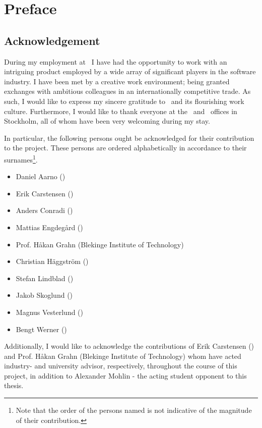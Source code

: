 
\chapter*{Preface}
\label{cha:preface}

\section*{Acknowledgement}
\label{sec:preface_acknowledgement}
During my employment at \dvttermintel\ I have had the opportunity to work with an intriguing product employed by a wide array of significant players in the software industry.
I have been met by a creative work environment; being granted exchanges with ambitious colleagues in an internationally competitive trade.
As such, I would like to express my sincere gratitude to \dvttermintel\ and its flourishing work culture.
Furthermore, I would like to thank everyone at the \dvttermintel\ and \dvttermwindriver\ offices in Stockholm, all of whom have been very welcoming during my stay.

In particular, the following persons ought be acknowledged for their contribution to the project.
These persons are ordered alphabetically in accordance to their surnames\footnote{Note that the order of the persons named is not indicative of the magnitude of their contribution.}.

\begin{itemize}[noitemsep]
	\item Daniel Aarno (\dvttermintel )
	\item Erik Carstensen (\dvttermintel )
	\item Anders Conradi (\dvttermintel )
	\item Mattias Engdegård (\dvttermintel )
	\item Prof. Håkan Grahn (Blekinge Institute of Technology)
	\item Christian Häggström (\dvttermintel )
	\item Stefan Lindblad (\dvttermintel )
	\item Jakob Skoglund (\dvttermwindriver )
	\item Magnus Vesterlund (\dvttermwindriver )
	\item Bengt Werner (\dvttermintel )
\end{itemize}

Additionally, I would like to acknowledge the contributions of Erik Carstensen (\dvttermintel ) and Prof. Håkan Grahn (Blekinge Institute of Technology) whom have acted industry- and university advisor, respectively, throughout the course of this project, in addition to Alexander Mohlin - the acting student opponent to this thesis.

